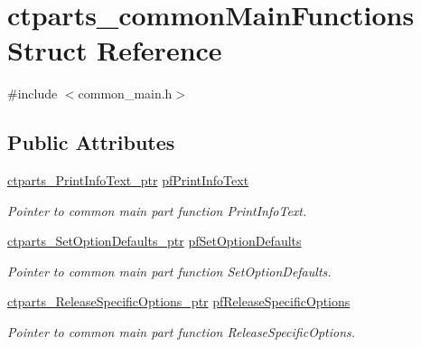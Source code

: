 \hypertarget{structctparts__commonMainFunctions}{}\section{ctparts\+\_\+common\+Main\+Functions Struct Reference}
\label{structctparts__commonMainFunctions}


{\ttfamily \#include $<$common\+\_\+main.\+h$>$}

\subsection*{Public Attributes}
\begin{DoxyCompactItemize}
\item 
\hypertarget{structctparts__commonMainFunctions_acfe9a39fcb20a624b5eb36e0403250e3}{}\label{structctparts__commonMainFunctions_acfe9a39fcb20a624b5eb36e0403250e3} 
\hyperlink{common__main_8h_ad9160baf11a222e3ca9620cbf3baaf46}{ctparts\+\_\+\+Print\+Info\+Text\+\_\+ptr} \hyperlink{structctparts__commonMainFunctions_acfe9a39fcb20a624b5eb36e0403250e3}{pf\+Print\+Info\+Text}
\begin{DoxyCompactList}\small\item\em Pointer to common main part function Print\+Info\+Text. \end{DoxyCompactList}\item 
\hypertarget{structctparts__commonMainFunctions_aa157ab86f7d40d7fc2eed2a04124089d}{}\label{structctparts__commonMainFunctions_aa157ab86f7d40d7fc2eed2a04124089d} 
\hyperlink{common__main_8h_a40f2bbc2d3b9af97b195e4ac9f739c89}{ctparts\+\_\+\+Set\+Option\+Defaults\+\_\+ptr} \hyperlink{structctparts__commonMainFunctions_aa157ab86f7d40d7fc2eed2a04124089d}{pf\+Set\+Option\+Defaults}
\begin{DoxyCompactList}\small\item\em Pointer to common main part function Set\+Option\+Defaults. \end{DoxyCompactList}\item 
\hypertarget{structctparts__commonMainFunctions_a2dc23efc574cd93d31a994d6cb7e78c4}{}\label{structctparts__commonMainFunctions_a2dc23efc574cd93d31a994d6cb7e78c4} 
\hyperlink{common__main_8h_ab8c4dc665e9f7d150ac80c02a6ecb336}{ctparts\+\_\+\+Release\+Specific\+Options\+\_\+ptr} \hyperlink{structctparts__commonMainFunctions_a2dc23efc574cd93d31a994d6cb7e78c4}{pf\+Release\+Specific\+Options}
\begin{DoxyCompactList}\small\item\em Pointer to common main part function Release\+Specific\+Options. \end{DoxyCompactList}\item 

\end{DoxyCompactItemize}
